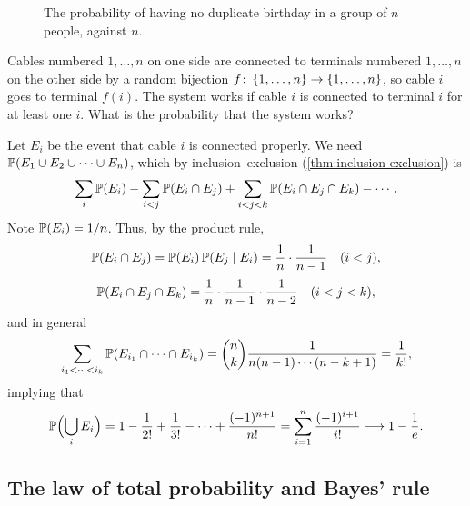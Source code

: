 \begin{figure}[H]
\centering
{}
\caption{The probability of having no duplicate birthday in a group of $n$ people, against $n$.}
\label{fig:birthday}
\end{figure}

\begin{example}\label{ex:cable-matching}
Cables numbered $1, \ldots, n$ on one side are connected to terminals numbered $1, \ldots, n$ on the other side by a random bijection $f \colon \left\{ 1, \ldots, n \right\} \to \left\{ 1, \ldots, n \right\}$, so cable $i$ goes to terminal $f(i)$. The system works if cable $i$ is connected to terminal $i$ for at least one $i$. What is the probability that the system works?
\end{example}

\begin{solution}
Let $E_i$ be the event that cable $i$ is connected properly. We need $\mathbb{P}(E_1 \cup E_2 \cup \cdots \cup E_n)$, which by inclusion--exclusion (\cref{thm:inclusion-exclusion}) is
\[
  \sum_i \mathbb{P}(E_i) - \sum_{i<j} \mathbb{P}(E_i \cap E_j) + \sum_{i<j<k} \mathbb{P}(E_i \cap E_j \cap E_k) - \cdots.
\]
Note $\mathbb{P}(E_i) = 1/n$. Thus, by the product rule,
\[
  \mathbb{P}(E_i \cap E_j) = \mathbb{P}(E_i)\,\mathbb{P}(E_j \mid E_i) = \frac1n \cdot \frac{1}{n-1} \quad (i < j),
\]
\[
  \mathbb{P}(E_i \cap E_j \cap E_k) = \frac1n \cdot \frac{1}{n-1} \cdot \frac{1}{n-2} \quad (i < j < k),
\]
and in general
\[
  \sum_{i_1 < \cdots < i_k} \mathbb{P}(E_{i_1} \cap \cdots \cap E_{i_k}) = \binom{n}{k} \frac{1}{n(n-1)\cdots(n-k+1)} = \frac{1}{k!},
\]
implying that
\[
  \mathbb{P}\Bigl(\bigcup_i E_i\Bigr) = 1 - \frac{1}{2!} + \frac{1}{3!} - \cdots + \frac{(-1)^{n+1}}{n!} = \sum_{i=1}^n \frac{(-1)^{i+1}}{i!} \longrightarrow 1 - \frac1e.
\]
\end{solution}

\subsection{The law of total probability and Bayes' rule}\label{sec:total-probability-bayes}

